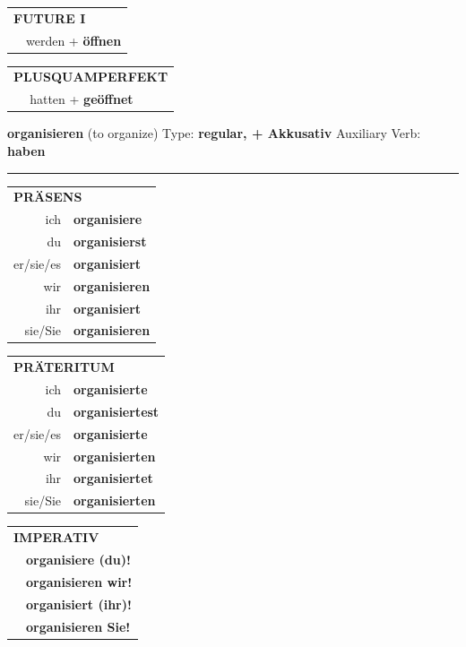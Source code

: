\documentclass[10pt,a4paper]{revtex4-2}
\begin{document}
\begin{verbbox-acc}
\begin{tabular}{rl}
    \multicolumn{2}{l}{\textbf{FUTURE I} }\\
  &  werden + \textbf{öffnen}\\
 
  \end{tabular}
\hfill
   \begin{tabular}{rl}
      \multicolumn{2}{l}{\textbf{PLUSQUAMPERFEKT}}\\
  &  hatten + \textbf{geöffnet}\\
  \end{tabular}
  
  \vspace{-5pt}


\end{verbbox-acc}

\begin{verbbox-acc}
{\Large \bf organisieren} (to organize) \hfill Type: \textbf{regular, + Akkusativ} \hfill Auxiliary Verb: \textbf{haben}

\vspace{5pt}
\hrule
\vspace{5pt}

\begin{tabular}{rl}
\multicolumn{2}{l}{\textbf{PRÄSENS}}\\
ich & \textbf{organisiere}\\
du & \textbf{organisierst}\\
er/sie/es & \textbf{organisiert}\\
wir & \textbf{organisieren}\\
ihr & \textbf{organisiert}\\
sie/Sie & \textbf{organisieren}\\
\end{tabular}
\hfill
\begin{tabular}{rl}
\multicolumn{2}{l}{\textbf{PRÄTERITUM}}\\
ich & \textbf{organisierte}\\
du & \textbf{organisiertest}\\
er/sie/es & \textbf{organisierte}\\
wir & \textbf{organisierten}\\
ihr & \textbf{organisiertet}\\
sie/Sie & \textbf{organisierten}\\
\end{tabular}
\hfill
\begin{tabular}{rl}
\multicolumn{2}{l}{\textbf{IMPERATIV}}\\
& \textbf{organisiere (du)!}\\
& \textbf{organisieren wir!}\\
& \textbf{organisiert (ihr)!}\\
& \textbf{organisieren Sie!}\\
\end{tabular}


\end{verbbox-acc}
\end{document}
